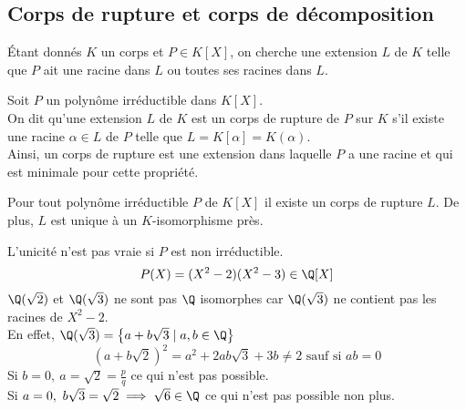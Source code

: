 \subsection{Corps de rupture et corps de décomposition}

Étant donnés $K$ un corps et $P\in K[X]$, on cherche une extension $L$ de $K$ telle que $P$ ait une racine dans $L$ ou toutes ses racines dans $L$.



\begin{definition}
	Soit $P$ un polynôme irréductible dans $K[X]$.\\
	On dit qu'une extension $L$ de $K$ est un corps de rupture de $P$ sur $K$ s'il existe une
	racine $\alpha \in L$ de $P$ telle que $L = K[\alpha] = K(\alpha)$. \\
	Ainsi, un corps de rupture est une extension dans laquelle $P$ a une racine et
	qui est minimale pour cette propriété.
\end{definition}

\begin{theorem}
	Pour tout polynôme irréductible $P$ de $K[X]$ il existe un corps de rupture $L$.
	De plus, $L$ est unique à un $K$-isomorphisme près.
\end{theorem}


\begin{remarque}
	L'unicité n'est pas vraie si $P$ est non irréductible.
	$$ P(X) = (X^2 - 2) (X^2 - 3) \in \Q[X]$$
	$\Q(\sqrt{2})$ et $\Q(\sqrt{3})$ ne sont pas $\Q$ isomorphes car
	$\Q(\sqrt{3})$ ne contient pas les racines de $X^2-2$.\\
	En effet, $\Q(\sqrt{3}) = \left\{  a + b\sqrt{3} \mid a,b \in \Q  \right\}$
	$$ (a + b\sqrt{2}) ^2 = a^2 + 2ab\sqrt{3}  + 3b \neq 2 \text{ sauf si } ab = 0$$
	Si $b=0, \ a = \sqrt{2} = \frac{p}{q}$ ce qui n'est pas possible. \\
	Si $a=0, \ b\sqrt{3} = \sqrt{2} \implies \sqrt{6} \in \Q $ ce qui n'est pas possible non plus.
\end{remarque}



